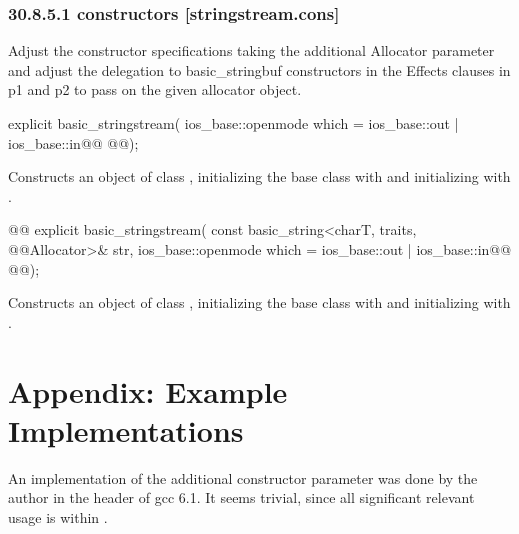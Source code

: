 \documentclass[ebook,11pt,article]{memoir}
\begin{document}
\subsection{30.8.5.1  constructors [stringstream.cons]}
Adjust the constructor specifications taking the additional Allocator parameter and adjust the delegation to basic_stringbuf constructors in the Effects clauses in p1 and p2 to pass on the given allocator object.
\begin{itemdecl}
explicit basic_stringstream(
  ios_base::openmode which = ios_base::out | ios_base::in@\added{,}@
  @@);
\end{itemdecl}

\begin{itemdescr}
\pnum
\effects
Constructs an object of class
,
initializing the base class with
and initializing
with
.
\end{itemdescr}

%
\begin{itemdecl}
@@
explicit basic_stringstream(
  const basic_string<charT, traits, @@Allocator>& str,
  ios_base::openmode which = ios_base::out | ios_base::in@\added{,}@
  @@);
\end{itemdecl}

\begin{itemdescr}
\pnum
\effects
Constructs an object of class
,
initializing the base class with
and initializing
with
.
\end{itemdescr}



\chapter{Appendix: Example Implementations}
An implementation of the additional constructor parameter was done by the author in the  header of gcc 6.1. It seems trivial, since all significant relevant usage is within . 
\end{document}
